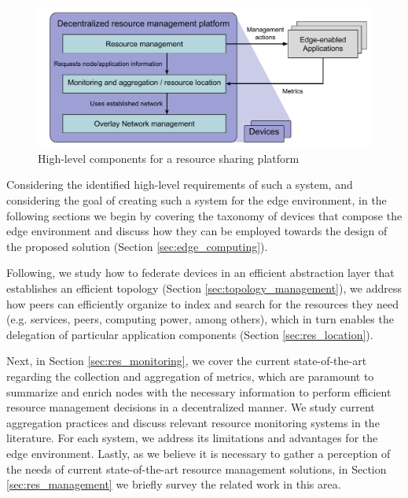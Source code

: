 \begin{figure}
    \centering
    \includegraphics[width=0.8\linewidth]{Chapters/Figures/Resource management- generic arch.pdf}
    \caption{High-level components for a resource sharing platform}
    \label{fig:proposed_architecture}
\end{figure}


Considering the identified high-level requirements of such a system, and considering the goal of creating such a system for the edge environment, in the following sections we begin by covering the taxonomy of devices that compose the edge environment and discuss how they can be employed towards the design of the proposed solution (Section \ref{sec:edge_computing}). 

Following, we study how to federate devices in an efficient abstraction layer that establishes an efficient topology (Section \ref{sec:topology_management}), we address how peers can efficiently organize to index and search for the resources they need (e.g. services, peers, computing power, among others), which in turn enables the delegation of particular application components (Section \ref{sec:res_location}). 


Next, in Section \ref{sec:res_monitoring}, we cover the current state-of-the-art regarding the collection and aggregation of metrics, which are paramount to summarize and enrich nodes with the necessary information to perform efficient resource management decisions in a decentralized manner. We study current aggregation practices and discuss relevant resource monitoring systems in the literature. For each system, we address its limitations and advantages for the edge environment. Lastly, as we believe it is necessary to gather a perception of the needs of current state-of-the-art resource management solutions, in Section \ref{sec:res_management} we briefly survey the related work in this area.

